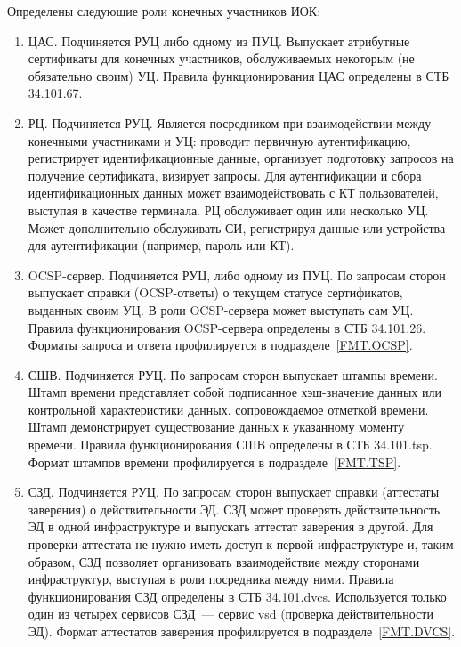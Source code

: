 Определены следующие роли конечных участников ИОК:
\begin{enumerate}
\item
ЦАС. Подчиняется РУЦ либо одному из ПУЦ. 
Выпускает атрибутные сертификаты для 
конечных участников, обслуживаемых некоторым (не обязательно своим) УЦ.
Правила функционирования ЦАС определены в СТБ 34.101.67.

\item
РЦ. Подчиняется РУЦ.
Является посредником при взаимодействии между конечными участниками и УЦ:
проводит первичную аутентификацию, регистрирует идентификационные данные,
организует подготовку запросов на получение сертификата, визирует запросы. 
%
Для аутентификации и сбора идентификационных данных может 
взаимодействовать с КТ пользователей, выступая в качестве терминала. 
%  
РЦ обслуживает один или несколько УЦ. Может дополнительно 
обслуживать СИ, регистрируя данные или устройства для аутентификации 
(например, пароль или КТ). 

\item
OCSP-сервер. Подчиняется РУЦ, либо одному из ПУЦ.
По запросам сторон выпускает справки (OCSP-ответы)
о текущем статусе сертификатов, выданных своим УЦ. 
В роли OCSP-сервера может выступать сам УЦ.
Правила функционирования OCSP-сервера определены в СТБ 34.101.26.
%
Форматы запроса и ответа профилируется в подразделе~\ref{FMT.OCSP}.

\item
СШВ. Подчиняется РУЦ.
По запросам сторон выпускает штампы времени.
Штамп времени представляет собой подписанное хэш-значение данных или 
контрольной характеристики данных, сопровождаемое отметкой времени. Штамп 
демонстрирует существование данных к указанному моменту времени. Правила 
функционирования СШВ определены в СТБ 34.101.tsp. 
%
Формат штампов времени профилируется в подразделе~\ref{FMT.TSP}.

\item
СЗД. Подчиняется РУЦ.
По запросам сторон выпускает справки (аттестаты заверения)
о действительности ЭД. 
%
СЗД может проверять действительность ЭД в одной инфраструктуре и 
выпускать аттестат заверения в другой. Для проверки аттестата не нужно 
иметь доступ к первой инфраструктуре и, таким образом, СЗД позволяет 
организовать взаимодействие между сторонами инфраструктур, выступая в роли 
посредника между ними. 
%
Правила функционирования СЗД определены в СТБ 34.101.dvcs.
Используется только один из четырех сервисов СЗД~---
сервис vsd (проверка действительности ЭД).
%
Формат аттестатов заверения профилируется в подразделе~\ref{FMT.DVCS}.


\end{enumerate}
